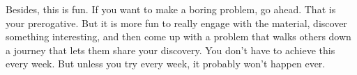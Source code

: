\documentclass{article}\usepackage[utf8]{inputenc}\usepackage[margin=0.4cm,top=0.4cm,bottom=0.4cm]{geometry}\usepackage[usenames,dvipsnames,svgnames,table]{xcolor}
\begin{document}
\noindent Besides, this is fun. If you want to make a boring problem, go ahead. That is your prerogative. But it is more fun to really engage with the material, discover something interesting, and then come up with a problem that walks others down a journey that lets them share your discovery. You don't have to achieve this every week. But unless you try every week, it probably won't happen ever. 
\BeginSolution
\EndSolution
\clearpage
\end{document}
